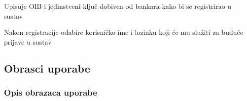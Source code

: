 \begin{packed_enum}
\begin{packed_enum}
				\end{packed_enum}
				
				\item	{}
				
				\begin{packed_enum}
					
					\item Upisuje OIB i jedinstveni ključ dobiven od bankara kako bi se registrirao u sustav
					\item Nakon registracije odabire korisničko ime i lozinku koji će mu služiti za buduće prijave u sustav
					
				\end{packed_enum}
			
			\end{packed_enum}
			
			\eject 
			
			
				
			\subsection{Obrasci uporabe}
				
				\subsubsection{Opis obrazaca uporabe}
				
